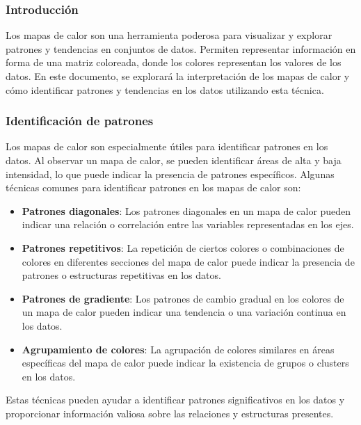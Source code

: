\documentclass{article}
\begin{document}
\subsubsection{Introducción}
Los mapas de calor son una herramienta poderosa para visualizar y explorar patrones y tendencias en conjuntos de datos. Permiten representar información en forma de una matriz coloreada, donde los colores representan los valores de los datos. En este documento, se explorará la interpretación de los mapas de calor y cómo identificar patrones y tendencias en los datos utilizando esta técnica.

\subsubsection{Identificación de patrones}
Los mapas de calor son especialmente útiles para identificar patrones en los datos. Al observar un mapa de calor, se pueden identificar áreas de alta y baja intensidad, lo que puede indicar la presencia de patrones específicos. Algunas técnicas comunes para identificar patrones en los mapas de calor son:

\begin{itemize}
  \item \textbf{Patrones diagonales}: Los patrones diagonales en un mapa de calor pueden indicar una relación o correlación entre las variables representadas en los ejes.
  \item \textbf{Patrones repetitivos}: La repetición de ciertos colores o combinaciones de colores en diferentes secciones del mapa de calor puede indicar la presencia de patrones o estructuras repetitivas en los datos.
  \item \textbf{Patrones de gradiente}: Los patrones de cambio gradual en los colores de un mapa de calor pueden indicar una tendencia o una variación continua en los datos.
  \item \textbf{Agrupamiento de colores}: La agrupación de colores similares en áreas específicas del mapa de calor puede indicar la existencia de grupos o clusters en los datos.
\end{itemize}

Estas técnicas pueden ayudar a identificar patrones significativos en los datos y proporcionar información valiosa sobre las relaciones y estructuras presentes.

\end{document}

